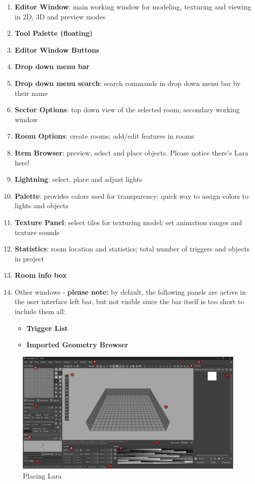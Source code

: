 \begin{enumerate}
    \item \textbf{Editor Window}: main working window for modeling, texturing and viewing in 2D, 3D and preview modes
    \item \textbf{Tool Palette (floating)}
    \item \textbf{Editor Window Buttons}
    \item \textbf{Drop down menu bar}
    \item \textbf{Drop down menu search}: search commands in drop down menu bar by their name
    \item \textbf{Sector Options}: top down view of the selected room; secondary working window
    \item \textbf{Room Options}: create rooms; add/edit features in rooms
    \item \textbf{Item Browser}: preview, select and place objects. Please notice there's Lara here!
    \item \textbf{Lightning}: select, place and adjust lights
    \item \textbf{Palette}: provides colors used for transparency; quick way to assign colors to lights and objects
    \item \textbf{Texture Panel}: select tiles for texturing model; set animation ranges and texture sounds
    \item \textbf{Statistics}: room location and statistics; total number of triggers and objects in project
    \item \textbf{Room info box}
    \item Other windows - \textbf{please note:} by default, the following panels are active in the user interface left bar, but not visible since the bar itself is too short to include them all: %
\begin{itemize}
    \item \textbf{Trigger List}
    \item \textbf{Imported Geometry Browser}
\end{itemize}

\end{enumerate}

\begin{figure}
    \centering
     \includegraphics[width=1\textwidth]{screenshots/1002.png}
     \caption{Placing Lara}
     \label{fig:TEUI} 
\end{figure}

